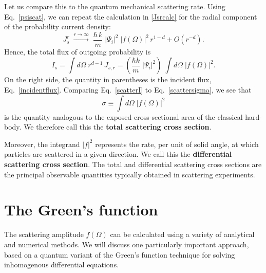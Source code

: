 \documentclass[pra,12pt]{revtex4-2}
\begin{document}
Let us compare this to the quantum mechanical scattering rate.  Using
Eq.~\eqref{psiscat}, we can repeat the calculation in \eqref{Jsrcalc}
for the radial component of the probability current density:
\begin{equation}
  J_s^r \; \overset{r\rightarrow\infty}{\longrightarrow}\;
  \frac{\hbar \,k}{m}\; |\Psi_i|^2 \; |f(\Omega)|^2 \,r^{1-d}
  + O(r^{-d}).
\end{equation}
Hence, the total flux of outgoing probability is
\begin{equation}
  I_s = \int d\Omega\; r^{d-1} \, J_{s,r}
  = \left(\frac{\hbar k}{m} \;|\Psi_i|^2\right) \; \int d\Omega\; \big|f(\Omega)\big|^2.
  \label{scatterI}
\end{equation}
On the right side, the quantity in parentheses is the incident flux,
Eq.~\eqref{incidentflux}.  Comparing Eq.~\eqref{scatterI} to
Eq.~\eqref{scattersigma}, we see that
\begin{equation*}
  \sigma \equiv \int d\Omega \; \big|f(\Omega)\big|^2
\end{equation*}
is the quantity analogous to the exposed cross-sectional area of the
classical hard-body.  We therefore call this the \textbf{total
  scattering cross section}.

Moreover, the integrand $|f|^2$ represents the rate, per unit of solid
angle, at which particles are scattered in a given direction.  We call
this the \textbf{differential scattering cross section}.  The total
and differential scattering cross sections are the principal
observable quantities typically obtained in scattering experiments.

\section{The Green's function}
\label{sec:greensfun}

The scattering amplitude $f(\Omega)$ can be calculated using a variety
of analytical and numerical methods.  We will discuss one particularly
important approach, based on a quantum variant of the Green's function
technique for solving inhomogenous differential equations.
\end{document}
